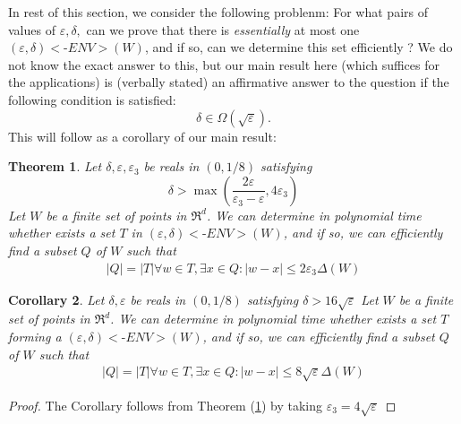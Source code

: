 \documentclass[11pt,letterpaper]{article}
\def\\{}%
\def\mathsf#1{<#1>}%
\newtheorem{theorem}{Theorem}[section]
\newtheorem{corollary}[theorem]{Corollary}
\theoremstyle{definition}
\theoremstyle{remark}
\newcommand{\dia}{\Delta}
\newcommand{\edenv}{{(\varepsilon, \delta){{\mathsf{\mbox{-}ENV}}}}}
\begin{document}
In rest of this section, we consider the following problenm: For what pairs of values of $\varepsilon,\delta,$ can we prove that there is {\em essentially} at most one $\edenv(W)$, and if so, can we determine this set efficiently ? 
We do not know the exact answer to this, but our main result here (which suffices for the applications) is 
(verbally stated) an affirmative answer to the question if the following condition is satisfied:
$$\delta\in \Omega(\sqrt\varepsilon).$$
This will follow as a corollary of our main result:

\begin{theorem}
\label{thm:soft}
Let
$\delta,\varepsilon,\varepsilon_3$ be reals in $(0,1/8)$ satisfying
\begin{equation}
\label{822}\delta> \max \left(\frac{2\varepsilon}{\varepsilon_3-\varepsilon}, 4 \varepsilon_3 \right)
\end{equation}
Let $W$ be a finite set of points in $\Re^d$. 
We can 
determine in polynomial time whether  exists a set $T$ in $\edenv(W)$, and if so,  we can efficiently 
find a subset $Q$ of $W$ such that
\begin{align}
|Q|=|T|\\
\forall w\in T, \exists x\in Q: |w-x|\leq 2\varepsilon_3 \dia(W)
\end{align}
\end{theorem}
\begin{corollary}\label{cor:soft}
Let
$\delta,\varepsilon$ be reals in $(0,1/8)$ satisfying $\delta>16\sqrt\varepsilon$
Let $W$ be a finite set of points in $\Re^d$. 
We can 
determine in polynomial time whether  exists a set $T$ forming a $\edenv(W)$, and if so,  we can efficiently 
find a subset $Q$ of $W$ such that
\begin{align}
|Q|=|T|\\
\forall w\in T, \exists x\in Q: |w-x|\leq 8\sqrt \varepsilon \dia(W)
\end{align} 
\end{corollary}
\begin{proof}
The Corollary follows from Theorem (\ref{thm:soft}) by taking $\varepsilon_3=4\sqrt\varepsilon$ 
\end{proof}
\end{document}
